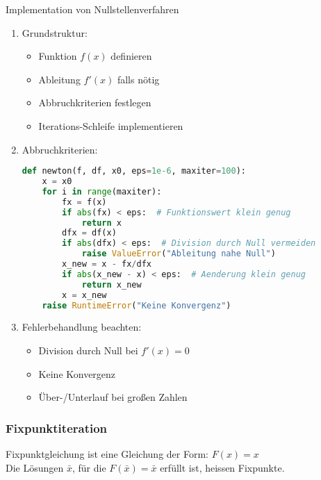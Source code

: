\begin{KR}{Implementation von Nullstellenverfahren}
\begin{enumerate}
    \item Grundstruktur:
    \begin{itemize}
        \item Funktion $f(x)$ definieren
        \item Ableitung $f'(x)$ falls nötig
        \item Abbruchkriterien festlegen
        \item Iterations-Schleife implementieren
    \end{itemize}
    
    \item Abbruchkriterien:
    \begin{lstlisting}[language=Python, style=base]
def newton(f, df, x0, eps=1e-6, maxiter=100):
    x = x0
    for i in range(maxiter):
        fx = f(x)
        if abs(fx) < eps:  # Funktionswert klein genug
            return x
        dfx = df(x)
        if abs(dfx) < eps:  # Division durch Null vermeiden
            raise ValueError("Ableitung nahe Null")
        x_new = x - fx/dfx
        if abs(x_new - x) < eps:  # Aenderung klein genug
            return x_new
        x = x_new
    raise RuntimeError("Keine Konvergenz")
    \end{lstlisting}
    
    \item Fehlerbehandlung beachten:
    \begin{itemize}
        \item Division durch Null bei $f'(x) = 0$
        \item Keine Konvergenz
        \item Über-/Unterlauf bei großen Zahlen
    \end{itemize}
\end{enumerate}
\end{KR}

\subsubsection{Fixpunktiteration}

\begin{definition}{Fixpunktgleichung}
ist eine Gleichung der Form: $F(x)=x$\\
Die Lösungen $\bar{x}$, für die $F(\bar{x})=\bar{x}$ erfüllt ist, heissen Fixpunkte.
\end{definition}

